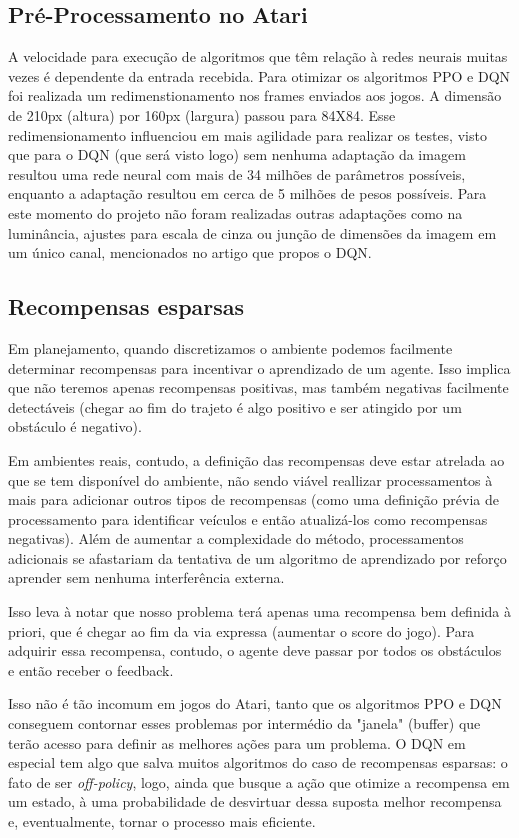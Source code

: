 \documentclass[letterpaper]{article} %
\begin{document}
\subsection{Pré-Processamento no Atari}
A velocidade para execução de algoritmos que têm relação à redes neurais muitas vezes é dependente da entrada recebida. Para otimizar os algoritmos PPO e DQN foi realizada um redimenstionamento nos frames enviados aos jogos. A dimensão de 210px (altura) por 160px (largura) passou para 84X84. Esse redimensionamento influenciou em mais agilidade para realizar os testes, visto que para o DQN (que será visto logo) sem nenhuma adaptação da imagem resultou uma rede neural com mais de 34 milhões de parâmetros possíveis, enquanto a adaptação resultou em cerca de 5 milhões de pesos possíveis. Para este momento do projeto não foram realizadas outras adaptações como na luminância, ajustes para escala de cinza ou junção de dimensões da imagem em um único canal, mencionados no artigo que propos o DQN.

\subsection{Recompensas esparsas}
Em planejamento, quando discretizamos o ambiente podemos facilmente determinar recompensas para incentivar o aprendizado de um agente. Isso implica que não teremos apenas recompensas positivas, mas também negativas facilmente detectáveis (chegar ao fim do trajeto é algo positivo e ser atingido por um obstáculo é negativo).

Em ambientes reais, contudo, a definição das recompensas deve estar atrelada ao que se tem disponível do ambiente, não sendo viável reallizar processamentos à mais para adicionar outros tipos de recompensas (como uma definição prévia de processamento para identificar veículos e então atualizá-los como recompensas negativas). Além de aumentar a complexidade do método, processamentos adicionais se afastariam da tentativa de um algoritmo de aprendizado por reforço aprender sem nenhuma interferência externa.

Isso leva à notar que nosso problema terá apenas uma recompensa bem definida à priori, que é chegar ao fim da via expressa (aumentar o score do jogo). Para adquirir essa recompensa, contudo, o agente deve passar por todos os obstáculos e então receber o feedback.

Isso não é tão incomum em jogos do Atari, tanto que os algoritmos PPO e DQN conseguem contornar esses problemas por intermédio da "janela" (buffer) que terão acesso para definir as melhores ações para um problema. O DQN em especial tem algo que salva muitos algoritmos do caso de recompensas esparsas: o fato de ser \textit{off-policy}, logo, ainda que busque a ação que otimize a recompensa em um estado, à uma probabilidade de desvirtuar dessa suposta melhor recompensa e, eventualmente, tornar o processo mais eficiente.
\end{document}
